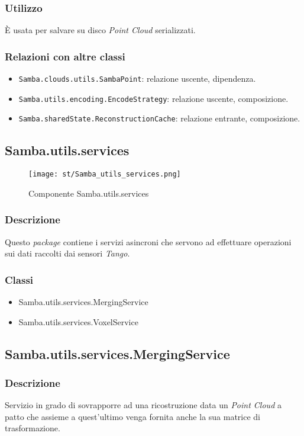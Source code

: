 \subsubsection{Utilizzo}
È usata per salvare su disco \emph{Point Cloud} serializzati.
\subsubsection{Relazioni con altre classi}
\begin{itemize}
	\item \texttt{Samba.clouds.utils.SambaPoint}: relazione uscente, dipendenza.
	\item \texttt{Samba.utils.encoding.EncodeStrategy}: relazione uscente, composizione.
	\item \texttt{Samba.sharedState.ReconstructionCache}: relazione entrante, composizione.
\end{itemize}

\subsection{Samba.utils.services}
\begin{figure}[H] 
    \centering 
    \texttt{[image: st/Samba\_utils\_services.png]} 
    \caption{Componente Samba.utils.services}
\end{figure}
\subsubsection{Descrizione}
Questo \emph{package} contiene i servizi asincroni che servono ad effettuare operazioni sui dati raccolti dai sensori \emph{Tango}.
\subsubsection{Classi}
\begin{itemize}
	\item Samba.utils.services.MergingService
	\item Samba.utils.services.VoxelService
\end{itemize}

\subsection{Samba.utils.services.MergingService}
\subsubsection{Descrizione}
Servizio in grado di sovrapporre ad una ricostruzione data un \emph{Point Cloud} a patto che assieme a quest'ultimo venga fornita anche la sua matrice di trasformazione.
